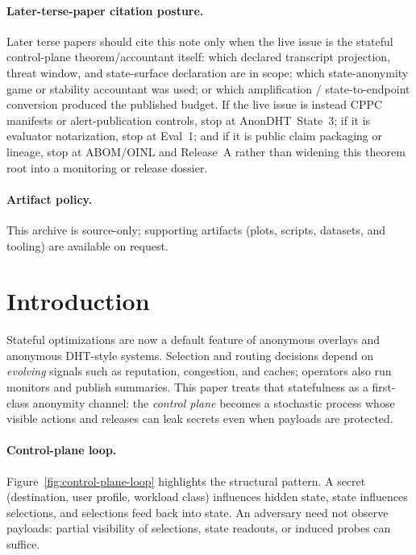 \documentclass[11pt]{article}
\begin{document}
\paragraph{Later-terse-paper citation posture.}
Later terse papers should cite this note only when the live issue is the stateful control-plane theorem/accountant itself: which declared transcript projection, threat window, and state-surface declaration are in scope; which state-anonymity game or stability accountant was used; or which amplification / state-to-endpoint conversion produced the published budget.
If the live issue is instead CPPC manifests or alert-publication controls, stop at AnonDHT~State~3; if it is evaluator notarization, stop at Eval~1; and if it is public claim packaging or lineage, stop at ABOM/OINL and Release~A rather than widening this theorem root into a monitoring or release dossier.\cite{series:state3,series:evalnotary,series:abomoinl,series:release}

\paragraph{Artifact policy.}
This archive is source-only; supporting artifacts (plots, scripts, datasets, and tooling) are available on request.\cite{series:artifactpolicy}



\section{Introduction}
Stateful optimizations are now a default feature of anonymous overlays and anonymous DHT-style systems.
Selection and routing decisions depend on \emph{evolving} signals such as reputation, congestion, and caches;
operators also run monitors and publish summaries.
This paper treats that statefulness as a first-class anonymity channel: the \emph{control plane} becomes a stochastic process whose visible actions and releases can leak secrets even when payloads are protected.

\paragraph{Control-plane loop.}
Figure~\ref{fig:control-plane-loop} highlights the structural pattern.
A secret (destination, user profile, workload class) influences hidden state, state influences selections, and selections feed back into state.
An adversary need not observe payloads: partial visibility of selections, state readouts, or induced probes can suffice.
\end{document}
